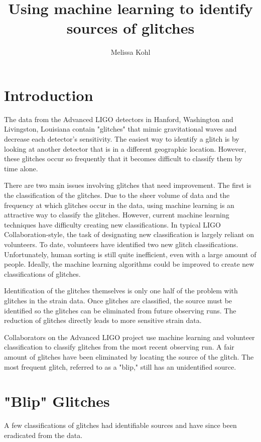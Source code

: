 \documentclass[a4paper]{article}
\title{Using machine learning to identify sources of glitches}
\author{Melissa Kohl}
\begin{document}
\maketitle

\section{Introduction}

The data from the Advanced LIGO detectors in Hanford, Washington and Livingston, Louisiana contain "glitches" that mimic gravitational waves and decrease each detector's sensitivity. The easiest way to identify a glitch is by looking at another detector that is in a different geographic location. However, these glitches occur so frequently that it becomes difficult to classify them by time alone. 

There are two main issues involving glitches that need improvement. The first is the classification of the glitches. Due to the sheer volume of data and the frequency at which glitches occur in the data, using machine learning is an attractive way to classify the glitches. However, current machine learning techniques have difficulty creating new classifications. In typical LIGO Collaboration-style, the task of designating new classification is largely reliant on volunteers. To date, volunteers have identified two new glitch classifications. Unfortunately, human sorting is still quite inefficient, even with a large amount of people. Ideally, the machine learning algorithms could be improved to create new classifications of glitches. 

Identification of the glitches themselves is only one half of the problem with glitches in the strain data. Once glitches are classified, the source must be identified so the glitches can be eliminated from future observing runs. The reduction of glitches directly leads to more sensitive strain data.

Collaborators on the Advanced LIGO project use machine learning and volunteer classification to classify glitches from the most recent observing run. A fair amount of glitches have been eliminated by locating the source of the glitch. The most frequent glitch, referred to as a "blip," still has an unidentified source.

\section{"Blip" Glitches}

A few classifications of glitches had identifiable sources and have since been eradicated from the data. 
\end{document}
